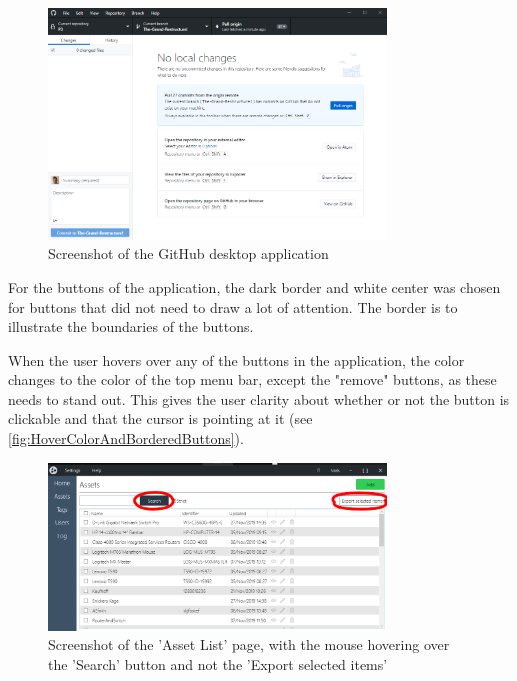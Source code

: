 \begin{figure}[H]
    \centering
    \includegraphics[width=0.8\textwidth]{figures/UIDesignElements/GitHub_Desktop_Screenshot.png}
    \caption{Screenshot of the GitHub desktop application \citep{GithubDesktop}}
    \label{fig:GitHubDesktop}
\end{figure}

For the buttons of the application, the dark border and white center was chosen for buttons that did not need to draw a lot of attention. The border is to illustrate the boundaries of the buttons.
\par
When the user hovers over any of the buttons in the application, the color changes to the color of the top menu bar, except the "remove" buttons, as these needs to stand out. This gives the user clarity about whether or not the button is clickable and that the cursor is pointing at it (see \autoref{fig:HoverColorAndBorderedButtons}).

\begin{figure}[H]
    \centering
    \includegraphics[width=0.8\textwidth]{figures/UIDesignElements/ButtonColors_AssetList.png}
    \caption{Screenshot of the 'Asset List' page, with the mouse hovering over the 'Search' button and not the 'Export selected items'}
    \label{fig:HoverColorAndBorderedButtons}
\end{figure}

